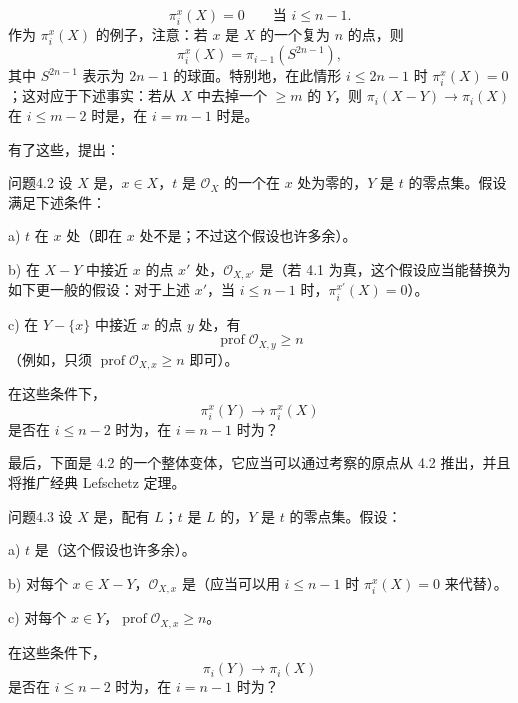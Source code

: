 \[
\pi_i^x(X)=0\qquad\text{当 }i\leq n-1.
\]
作为 $\pi_i^x(X)$ 的例子，注意：若 $x$ 是 $X$ 的一个复为 $n$ 的点，则
\[
\pi_i^x(X)=\pi_{i-1}(S^{2n-1}),
\]
其中 $S^{2n-1}$ 表示为 $2n-1$ 的球面。特别地，在此情形 $i\leq2n-1$ 时 $\pi_i^x(X)=0$；这对应于下述事实：若从 $X$ 中去掉一个 $\geq m$ 的 $Y$，则 $\pi_i(X-Y)\to\pi_i(X)$ 在 $i\leq m-2$ 时是，在 $i=m-1$ 时是。

有了这些，提出：
\begin{SGAresult}{问题}{4.2}
设 $X$ 是，$x\in X$，$t$ 是 $\mathcal O_X$ 的一个在 $x$ 处为零的，$Y$ 是 $t$ 的零点集。假设满足下述条件：

 a) $t$ 在 $x$ 处（即在 $x$ 处不是；不过这个假设也许多余）。

 b) 在 $X-Y$ 中接近 $x$ 的点 $x'$ 处，$\mathcal O_{X,x'}$ 是（若 4.1 为真，这个假设应当能替换为如下更一般的假设：对于上述 $x'$，当 $i\leq n-1$ 时，$\pi_i^{x'}(X)=0$）。

 c) 在 $Y-\{x\}$ 中接近 $x$ 的点 $y$ 处，有
\[
\operatorname{prof}\mathcal O_{X,y}\geq n
\]
（例如，只须 $\operatorname{prof}\mathcal O_{X,x}\geq n$ 即可）。

在这些条件下，
\[
\pi_i^x(Y)\longrightarrow\pi_i^x(X)
\]
是否在 $i\leq n-2$ 时为，在 $i=n-1$ 时为？
\end{SGAresult}
最后，下面是 4.2 的一个整体变体，它应当可以通过考察的原点从 4.2 推出，并且将推广经典 Lefschetz 定理。

\begin{SGAresult}{问题}{4.3}
设 $X$ 是，配有 $L$；$t$ 是 $L$ 的，$Y$ 是 $t$ 的零点集。假设：

 a) $t$ 是（这个假设也许多余）。

 b) 对每个 $x\in X-Y$，$\mathcal O_{X,x}$ 是（应当可以用 $i\leq n-1$ 时 $\pi_i^x(X)=0$ 来代替）。

 c) 对每个 $x\in Y$，$\operatorname{prof}\mathcal O_{X,x}\geq n$。

在这些条件下，
\[
\pi_i(Y)\longrightarrow\pi_i(X)
\]
是否在 $i\leq n-2$ 时为，在 $i=n-1$ 时为？
\end{SGAresult}

